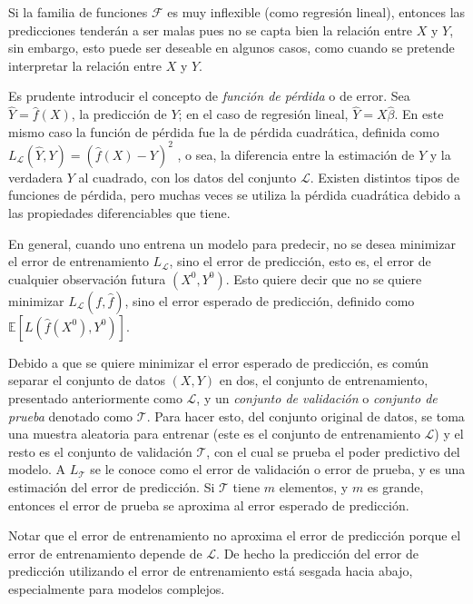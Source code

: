 Si la familia de funciones $\mathcal{F}$ es muy inflexible (como regresión lineal), entonces las predicciones tenderán a ser malas pues no se capta bien la relación entre $X$ y $Y$, sin embargo, esto puede ser deseable en algunos casos, como cuando se pretende interpretar la relación entre $X$ y $Y$.

Es prudente introducir el concepto de \textit{función de pérdida} o de error. Sea $\hat{Y} = \hat{f}(X)$, la predicción de $Y$; en el caso de regresión lineal, $\hat{Y} = X\hat{\beta}$. En este mismo caso la función de pérdida fue la de pérdida cuadrática, definida como 
$L_{\mathcal{L}}(\hat{Y}, Y) = (\hat{f}(X) - Y ) ^2$
, o sea, la diferencia entre la estimación de $Y$ y la verdadera $Y$ al cuadrado, con los datos del conjunto $\mathcal{L}$. Existen distintos tipos de funciones de pérdida, pero muchas veces se utiliza la pérdida cuadrática debido a las propiedades diferenciables que tiene.

En general, cuando uno entrena un modelo para predecir, no se desea minimizar el error de entrenamiento $L_{\mathcal{L}}$, sino el error de predicción, esto es, el error de cualquier observación futura $(X^0, Y^0)$. Esto quiere decir que no se quiere minimizar $L_{\mathcal{L}}(f, \hat{f})$, sino el error esperado de predicción, definido como $\mathbb{E} \left[ L(\hat{f}(X^0), Y^0 ) \right] $.

Debido a que se quiere minimizar el error esperado de predicción, es común separar el conjunto de datos $(X, Y)$ en dos, el conjunto de entrenamiento, presentado anteriormente como $\mathcal{L}$, y un \textit{conjunto de validación} o \textit{conjunto de prueba} denotado como $\mathcal{T}$. Para hacer esto, del conjunto original de datos, se toma una muestra aleatoria para entrenar (este es el conjunto de entrenamiento $\mathcal{L}$) y el resto es el conjunto de validación $\mathcal{T}$, con el cual se prueba el poder predictivo del modelo. A $L_{\mathcal{T}}$ se le conoce como el error de validación o error de prueba, y es una estimación del error de predicción. Si $\mathcal{T}$ tiene $m$ elementos, y $m$ es grande, entonces el error de prueba se aproxima al error esperado de predicción.

Notar que el error de entrenamiento no aproxima el error de predicción porque el error de entrenamiento depende de $\mathcal{L}$. De hecho la predicción del error de predicción utilizando el error de entrenamiento está sesgada hacia abajo, especialmente para modelos complejos.

